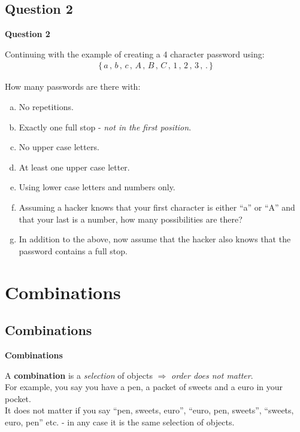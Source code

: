 \documentclass[compress]{beamer}        %
\makeatletter
\newcommand{\tcb}{\textcolor{beamer@blendedblue}}
\makeatother
\begin{document}
\subsection{Question 2}
\begin{frame}{\bf \tcb{Question 2}}

Continuing with the example of creating a 4 character password using:
\begin{align*}
\{\,a\,,\,b\,,\,c\,,\,A\,,\,B\,,\,C\,,\,1\,,\,2\,,\,3\,,\,.\,\}
\end{align*}

How many passwords are there with:\\[0.2cm]
\begin{enumerate}[a)]\itemsep0.2cm
\item No repetitions.
\item Exactly one full stop - \emph{not in the first position}.
\item No upper case letters.
\item At least one upper case letter.
\item Using lower case letters and numbers only.
\item Assuming a hacker knows that your first character is either ``a'' or ``A'' and that your last is a number, how many possibilities are there?
\item In addition to the above, now assume that the hacker also knows that the password contains a full stop.
\end{enumerate}


\end{frame}




\section{Combinations}
\subsection{Combinations}
\begin{frame}{\bf \tcb{Combinations}}

A {\bf combination} is a \emph{selection} of objects $\Rightarrow$ \emph{order does not matter}.\\[1cm]

For example, you say you have a pen, a packet of sweets and a euro in your pocket.\\[0.4cm]
It does not matter if you say ``pen, sweets, euro'', ``euro, pen, sweets'', ``sweets, euro, pen'' etc. - in any case it is the same selection of objects.

\end{frame}
\end{document}
